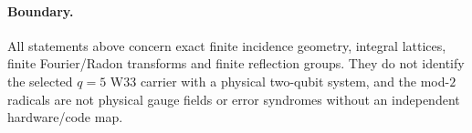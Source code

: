 \paragraph{Boundary.}
All statements above concern exact finite incidence geometry, integral lattices,
finite Fourier/Radon transforms and finite reflection groups.  They do not identify
the selected $q=5$ W33 carrier with a physical two-qubit system, and the mod-$2$
radicals are not physical gauge fields or error syndromes without an independent
hardware/code map.

